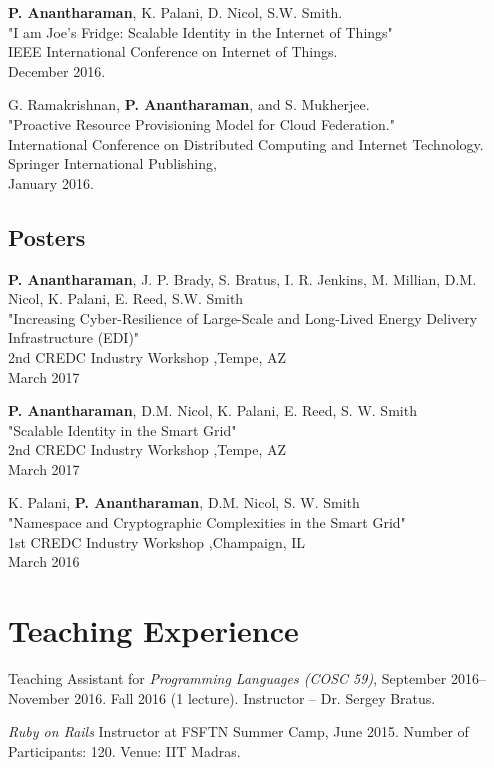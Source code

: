 \documentclass[letterpaper,10pt]{article}
\renewenvironment{itemize}{
  \begin{list}{}{
    \setlength{\leftmargin}{1.5em}
  }
}{
  \end{list}
}
\begin{document}
\begin{etaremune}
\setlength\itemsep{0ex}
\item {\bf P. Anantharaman}, K. Palani, D. Nicol, S.W. Smith.\\
    "I am Joe's Fridge: Scalable Identity in the Internet of Things"\\
    IEEE International Conference on Internet of Things.\\
    December 2016.
\item G. Ramakrishnan, {\bf P. Anantharaman}, and S. Mukherjee.\\
    "Proactive Resource Provisioning Model for Cloud Federation."\\
    International Conference on Distributed Computing and Internet Technology. Springer International Publishing,\\
    January 2016.
\end{etaremune}

\subsection*{Posters}

\begin{etaremune}
\setlength\itemsep{0ex}
\item \textbf{P. Anantharaman}, J. P. Brady, S. Bratus, I. R. Jenkins, M. Millian, D.M. Nicol, K. Palani, E. Reed, S.W. Smith\\
    "Increasing Cyber-Resilience of Large-Scale and Long-Lived Energy Delivery Infrastructure (EDI)"\\
    2nd CREDC Industry Workshop ,Tempe, AZ\\
    March 2017

\item \textbf{P. Anantharaman}, D.M. Nicol, K. Palani, E. Reed, S. W. Smith\\
    "Scalable Identity in the Smart Grid"\\
    2nd CREDC Industry Workshop ,Tempe, AZ\\
    March 2017
\item  K. Palani, {\bf P. Anantharaman}, D.M. Nicol, S. W. Smith\\
    "Namespace and Cryptographic Complexities in the Smart Grid"\\
    1st CREDC Industry Workshop ,Champaign, IL\\
    March 2016
\end{etaremune}

\section*{Teaching Experience}
\begin{itemize}
\setlength\itemsep{0ex}
\item Teaching Assistant for \textit{Programming Languages (COSC 59)}, September 2016-- November 2016.
		\subitem Fall 2016 (1 lecture). Instructor -- Dr. Sergey Bratus.
\item \textit{Ruby on Rails} Instructor at FSFTN Summer Camp, June 2015.
    \subitem Number of Participants: 120.
    \subitem Venue: IIT Madras.
\end{itemize}
\end{document}

